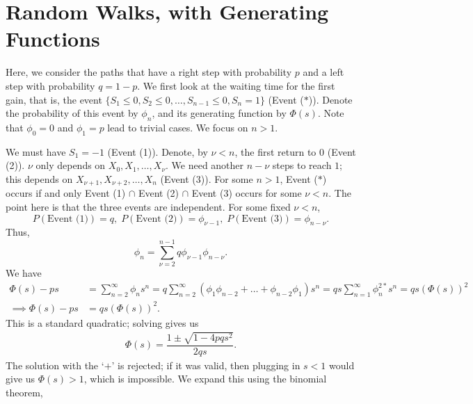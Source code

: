 \documentclass[15pt,a4paper]{book}
\theoremstyle{definition}
\begin{document}
\section{Random Walks, with Generating Functions}
Here, we consider the paths that have a right step with probability $p$ and a left step with probability $q = 1-p$.
We first look at the waiting time for the first gain, that is, the event $\{S_{1}\leq 0, S_{2} \leq 0, \ldots, S_{n-1} \leq 0, S_{n} = 1\}$ (Event ($\ast$)). Denote the probability of this event by $\phi_{n}$, and its generating function by $\Phi (s)$. Note that $\phi_{0} = 0$ and $\phi_{1} = p$ lead to trivial cases. We focus on $n > 1$.

We must have $S_{1} = -1$ (Event (1)). Denote, by $\nu < n$, the first return to $0$ (Event (2)). $\nu$ only depends on $X_{0},X_{1},\ldots,X_{\nu}$. We need another $n-\nu$ steps to reach $1$; this depends on $X_{\nu+1},X_{\nu+2},\ldots,X_{n}$ (Event (3)). For some $n > 1$, Event ($\ast$) occurs if and only Event (1) $\cap$ Event (2) $\cap$ Event (3) occurs for some $\nu < n$. The point here is that the three events are independent. For some fixed $\nu < n$,
\begin{equation}
    P(\text{Event (1)}) = q, \; P(\text{Event (2)}) = \phi_{\nu -1}, \; P(\text{Event (3)}) = \phi_{n-\nu}.
\end{equation}
Thus,
\begin{equation}
    \phi_{n} = \sum_{\nu = 2}^{n-1} q \phi_{\nu-1} \phi_{n-\nu}.
\end{equation}
We have
\begin{align}
    \Phi (s) - ps &= \sum_{n=2}^{\infty} \phi_{n}s^{n} = q\sum_{n=2}^{\infty} (\phi_{1}\phi_{n-2} + \ldots + \phi_{n-2}\phi_{1}) s^{n} = qs \sum_{n=1}^{\infty} \phi_{n}^{2 \ast} s^{n} = qs(\Phi(s))^{2} \\
    \implies \Phi (s) - ps &= qs(\Phi(s))^{2}.
\end{align}
This is a standard quadratic; solving gives us
\begin{align}
    \Phi (s) = \dfrac{1 \pm \sqrt{1-4pqs^{2}}}{2qs}.
\end{align}
The solution with the `$+$' is rejected; if it was valid, then plugging in $s < 1$ would give us $\Phi (s) > 1$, which is impossible. We expand this using the binomial theorem,
\end{document}
